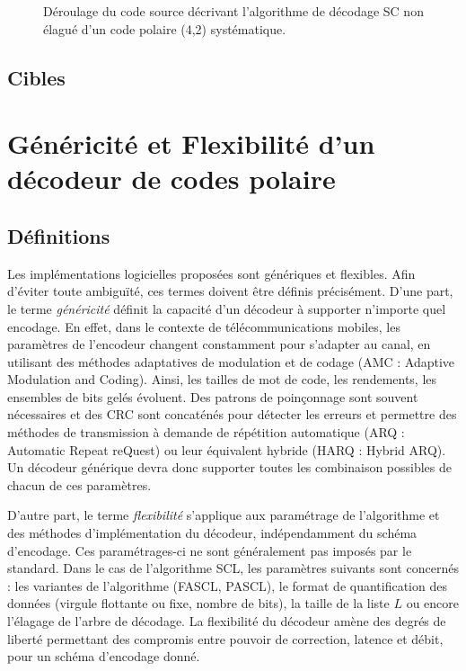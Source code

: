 \begin{figure}[t]
{\begin{minipage}{.35\linewidth}
  \label{fig:unrolled_tree}
  \end{minipage}%
  }
  \caption{Déroulage du code source décrivant l'algorithme de décodage SC non élagué d'un code polaire (4,2) systématique.}
  \label{fig:unrolling}
\end{figure}

\subsection{Cibles}

\section{Généricité et Flexibilité d'un décodeur de codes polaire}

\label{sec:gen_scl}
\subsection{Définitions}
Les implémentations logicielles proposées sont génériques et flexibles. Afin d'éviter toute ambiguïté, ces termes doivent être définis précisément.
D'une part, le terme \textit{généricité} définit la capacité d'un décodeur à supporter n'importe quel encodage.
En effet, dans le contexte de télécommunications mobiles, les paramètres de l'encodeur changent constamment pour s'adapter au canal, en utilisant des méthodes adaptatives de modulation et de codage \cite{dahlman_4g:_2013} (AMC : Adaptive Modulation and Coding). Ainsi, les tailles de mot de code, les rendements, les ensembles de bits gelés évoluent. Des patrons de poinçonnage sont souvent nécessaires et des CRC sont concaténés pour détecter les erreurs et permettre des méthodes de transmission à demande de répétition automatique (ARQ : Automatic Repeat reQuest) ou leur équivalent hybride (HARQ : Hybrid ARQ). Un décodeur générique devra donc supporter toutes les combinaison possibles de chacun de ces paramètres.

D'autre part, le terme \textit{flexibilité} s'applique aux paramétrage de l'algorithme et des méthodes d'implémentation du décodeur, indépendamment du schéma d'encodage. Ces paramétrages-ci ne sont généralement pas imposés par le standard. Dans le cas de l'algorithme SCL, les paramètres suivants sont concernés : les variantes de l'algorithme (FASCL, PASCL), le format de quantification des données (virgule flottante ou fixe, nombre de bits), la taille de la liste $L$ ou encore l'élagage de l'arbre de décodage. La flexibilité du décodeur amène des degrés de liberté permettant des compromis entre pouvoir de correction, latence et débit, pour un schéma d'encodage donné.

